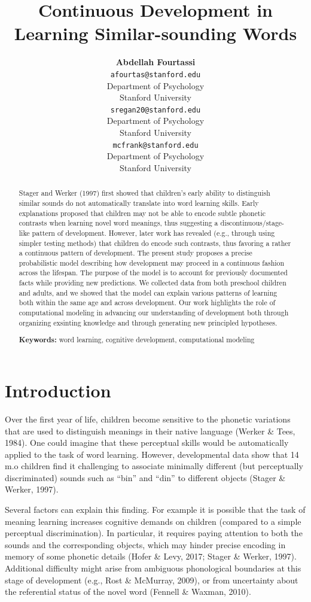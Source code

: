 \documentclass[10pt, letterpaper]{article}
\title{Continuous Development in Learning Similar-sounding Words}
\author{{\large \bf Abdellah Fourtassi} \\ \texttt{afourtas@stanford.edu} \\ Department of Psychology \\ Stanford University \And {\large \bf Sophie Regan} \\ \texttt{sregan20@stanford.edu} \\ Department of Psychology \\ Stanford University \And {\large \bf Michael C. Frank} \\ \texttt{mcfrank@stanford.edu} \\ Department of Psychology \\ Stanford University}
\begin{document}
\maketitle

\begin{abstract}
Stager and Werker (1997) first showed that children's early ability to
distinguish similar sounds do not automatically translate into word
learning skills. Early explanations proposed that children may not be
able to encode subtle phonetic contrasts when learning novel word
meanings, thus suggesting a discontinuous/stage-like pattern of
development. However, later work has revealed (e.g., through using
simpler testing methods) that children do encode such contrasts, thus
favoring a rather a continuous pattern of development. The present study
proposes a precise probabilistic model describing how development may
proceed in a continuous fashion across the lifespan. The purpose of the
model is to account for previously documented facts while providing new
predictions. We collected data from both preschool children and adults,
and we showed that the model can explain various patterns of learning
both within the same age and across development. Our work highlights the
role of computational modeling in advancing our understanding of
development both through organizing exsinting knowledge and through
generating new principled hypotheses.

\textbf{Keywords:}
word learning, cognitive development, computational modeling
\end{abstract}

\section{Introduction}\label{introduction}

Over the first year of life, children become sensitive to the phonetic
variations that are used to distinguish meanings in their native
language (Werker \& Tees, 1984). One could imagine that these perceptual
skills would be automatically applied to the task of word learning.
However, developmental data show that 14 m.o children find it
challenging to associate minimally different (but perceptually
discriminated) sounds such as ``bin'' and ``din'' to different objects
(Stager \& Werker, 1997).

Several factors can explain this finding. For example it is possible
that the task of meaning learning increases cognitive demands on
children (compared to a simple perceptual discrimination). In
particular, it requires paying attention to both the sounds and the
corresponding objects, which may hinder precise encoding in memory of
some phonetic details (Hofer \& Levy, 2017; Stager \& Werker, 1997).
Additional difficulty might arise from ambiguous phonological boundaries
at this stage of development (e.g., Rost \& McMurray, 2009), or from
uncertainty about the referential status of the novel word (Fennell \&
Waxman, 2010).
\end{document}
